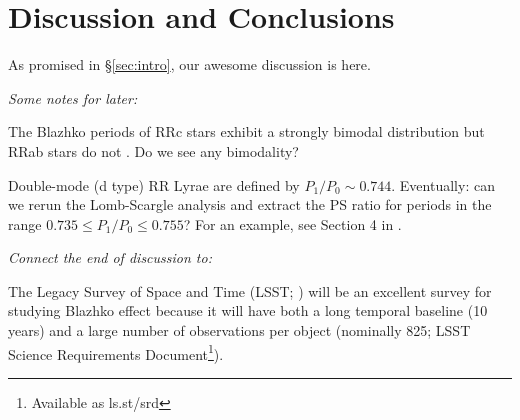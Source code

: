 

\section{Discussion and Conclusions\label{sec:discussion}}

As promised in \S\ref{sec:intro}, our awesome discussion is here.


{\it Some notes for later:}

The Blazhko periods of RRc stars exhibit a strongly bimodal distribution but RRab stars do not
\citep[see][]{2007MNRAS.377.1263S}. Do we see any bimodality? 

Double-mode (d type) RR Lyrae are defined by $P_1/P_0 \sim 0.744$.
Eventually: can we rerun the Lomb-Scargle analysis and extract
the PS ratio for periods in the range $0.735 \le P_1/P_0 \le 0.755$?
For an example, see Section 4 in \cite{2007MNRAS.377.1263S}. 


{\it Connect the end of discussion to:}

The Legacy Survey of Space and Time (LSST; \citealt{2019ApJ...873..111I}) will be an excellent survey for studying Blazhko effect
\citep{2022ApJS..258....4H} because it will have both a long temporal
baseline (10 years) and a large number of observations per object
(nominally 825; LSST Science Requirements Document\footnote{Available as ls.st/srd}).




